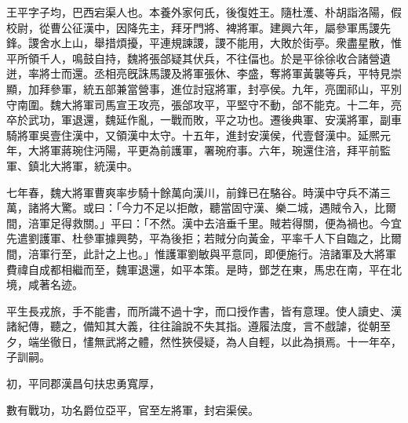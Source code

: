 \begin{pinyinscope}
 
 
 王平字子均，巴西宕渠人也。本養外家何氏，後復姓王。隨杜濩、朴胡詣洛陽，假校尉，從曹公征漢中，因降先主，拜牙門將、裨將軍。建興六年，屬參軍馬謖先鋒。謖舍水上山，舉措煩擾，平連規諫謖，謖不能用，大敗於街亭。衆盡星散，惟平所領千人，鳴鼓自持，魏將張郃疑其伏兵，不往偪也。於是平徐徐收合諸營遺迸，率將士而還。丞相亮旣誅馬謖及將軍張休、李盛，奪將軍黃襲等兵，平特見崇顯，加拜參軍，統五部兼當營事，進位討寇將軍，封亭侯。九年，亮圍祁山，平別守南圍。魏大將軍司馬宣王攻亮，張郃攻平，平堅守不動，郃不能克。十二年，亮卒於武功，軍退還，魏延作亂，一戰而敗，平之功也。遷後典軍、安漢將軍，副車騎將軍吳壹住漢中，又領漢中太守。十五年，進封安漢侯，代壹督漢中。延熈元年，大將軍蔣琬住沔陽，平更為前護軍，署琬府事。六年，琬還住涪，拜平前監軍、鎮北大將軍，統漢中。
 
 
 
 
 七年春，魏大將軍曹爽率步騎十餘萬向漢川，前鋒已在駱谷。時漢中守兵不滿三萬，諸將大驚。或曰：「今力不足以拒敵，聽當固守漢、樂二城，遇賊令入，比爾間，涪軍足得救關。」平曰：「不然。漢中去涪垂千里。賊若得關，便為禍也。今宜先遣劉護軍、杜參軍據興勢，平為後拒；若賊分向黃金，平率千人下自臨之，比爾間，涪軍行至，此計之上也。」惟護軍劉敏與平意同，即便施行。涪諸軍及大將軍費禕自成都相繼而至，魏軍退還，如平本策。是時，鄧芝在東，馬忠在南，平在北境，咸著名迹。
 
 
 
 
 平生長戎旅，手不能書，而所識不過十字，而口授作書，皆有意理。使人讀史、漢諸紀傳，聽之，備知其大義，往往論說不失其指。遵履法度，言不戲謔，從朝至夕，端坐徹日，㦎無武將之體，然性狹侵疑，為人自輕，以此為損焉。十一年卒，子訓嗣。
 
 
 
 
 初，平同郡漢昌句扶忠勇寬厚，
 
 
 數有戰功，功名爵位亞平，官至左將軍，封宕渠侯。
 
 
\end{pinyinscope}